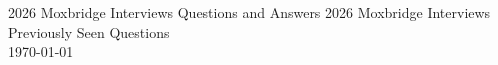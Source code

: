 

\begin{center}
	\ifprintanswers
	\Large{2026 Moxbridge Interviews Questions and Answers}
	\else
	\Large{2026 Moxbridge Interviews Previously Seen Questions}
	\fi
	\\
	\vspace{1ex}
	\large{\today}
\end{center}

\ifprintanswers
\tableofcontents

\else

\fi



\newpage

\begin{questions}

	\newpage
	\newpage
	
	\ifprintanswers
	\newpage
	\newpage
	\newpage
	\newpage
	\newpage
	\newpage
	\newpage
	\newpage
	\newpage
	\newpage
	\newpage
	\newpage
	\newpage
	
	\fi
	
\end{questions}

